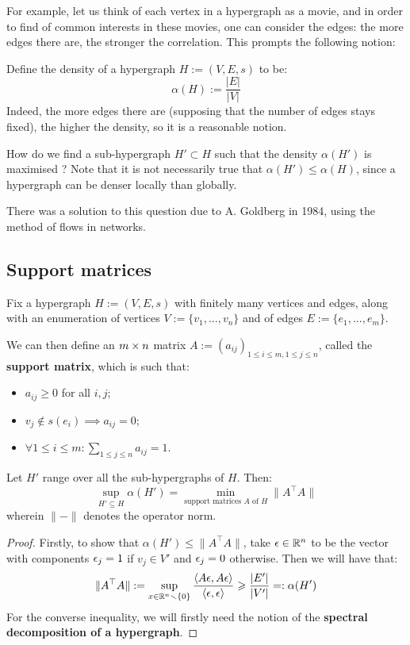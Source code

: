             For example, let us think of each vertex in a hypergraph as a movie, and in order to find  of common interests in these movies, one can consider the edges: the more edges there are, the stronger the correlation. This prompts the following notion:
            \begin{definition}
                Define the density of a hypergraph $H := (V, E, s)$ to be:
                    $$\alpha(H) := \frac{|E|}{|V|}$$
                Indeed, the more edges there are (supposing that the number of edges stays fixed), the higher the density, so it is a reasonable notion.
            \end{definition}
            \begin{question}
                How do we find a sub-hypergraph $H' \subset H$ such that the density $\alpha(H')$ is maximised ? Note that it is not necessarily true that $\alpha(H') \leq \alpha(H)$, since a hypergraph can be denser locally than globally. 
            \end{question}
            There was a solution to this question due to A. Goldberg in 1984, using the method of flows in networks.

        \subsection{Support matrices}
            Fix a hypergraph $H := (V, E, s)$ with finitely many vertices and edges, along with an enumeration of vertices $V := \{v_1, ..., v_n\}$ and of edges $E := \{e_1, ..., e_m\}$.

            We can then define an $m \x n$ matrix $A := (a_{ij})_{1 \leq i \leq m, 1 \leq j \leq n}$, called the \textbf{support matrix}, which is such that:
            \begin{itemize}
                \item $a_{ij} \geq 0$ for all $i, j$;
                \item $v_j \not \in s(e_i) \implies a_{ij} = 0$;
                \item $\forall 1 \leq i \leq m: \sum_{1 \leq j \leq n} a_{ij} = 1$.
            \end{itemize}

            \begin{theorem}
                Let $H'$ range over all the sub-hypergraphs of $H$. Then: 
                    $$\sup_{H' \subseteq H} \alpha(H') = \min_{\text{support matrices $A$ of $H$}} \|A^\top A\|$$
                wherein $\|-\|$ denotes the operator norm.
            \end{theorem}
                \begin{proof}
                    Firstly, to show that $\alpha(H') \leq \|A^{\top} A\|$, take $\epsilon \in \mathbb{R}^n$ to be the vector with components $\epsilon_j = 1$ if $v_j \in V'$ and $\epsilon_j = 0$ otherwise. Then we will have that:
                        $$\|A^{\top} A\| := \sup_{x \in \mathbb{R}^n \smallsetminus \{0\}} \frac{\langle A\epsilon, A\epsilon\rangle}{\langle\epsilon, \epsilon\rangle} \geqslant \frac{|E'|}{|V'|} =: \alpha(H')$$
                    For the converse inequality, we will firstly need the notion of the \textbf{spectral decomposition of a hypergraph}.
                \end{proof}

